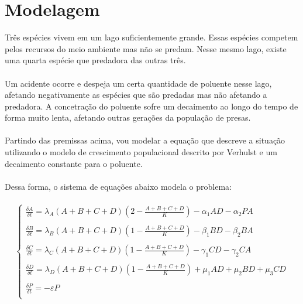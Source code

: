 \documentclass[a4paper]{article}
\begin{document}
\section{Modelagem}
Tr\^es esp\'ecies vivem em um lago suficientemente grande. Essas esp\'ecies competem pelos recursos do meio ambiente mas n\~ao se predam. Nesse mesmo lago, existe uma quarta esp\'ecie que predadora das outras tr\^es.
\\
\\
Um acidente ocorre e despeja um certa quantidade de poluente nesse lago, afetando negativamente as esp\'ecies que s\~ao predadas mas n\~ao afetando a predadora. A concetra\c{c}\~ao do poluente sofre um decaimento ao longo do tempo de forma muito lenta, afetando outras gera\c{c}\~oes da popula\c{c}\~ao de presas.
\\
\\
Partindo das premissas acima, vou modelar a equa\c{c}\~ao que descreve a situa\c{c}\~ao utilizando o modelo de crescimento populacional descrito por Verhulst e um decaimento constante para o poluente.
\\\
\\
Dessa forma, o sistema de equa\c{c}\~oes abaixo modela o problema:
\\
\\
\begin{equation}
\left\{\begin{array}{l}
\frac{\delta A}{\delta t} =  \lambda_A (A + B + C + D)(2 - \frac{A + B + C +D}{K}) -\alpha_1AD - \alpha_2PA  \\
\\
\frac{\delta B}{\delta t} =  \lambda_B (A + B + C + D)(1 - \frac{A + B + C +D}{K}) -\beta_1BD - \beta_2BA  \\
\\
\frac{\delta C}{\delta t} =  \lambda_C (A + B + C + D)(1 - \frac{A + B + C +D}{K}) -\gamma_1CD - \gamma_2CA  \\
\\
\frac{\delta D}{\delta t} =  \lambda_D (A + B + C + D)(1 - \frac{A + B + C +D}{K}) + \mu_1AD + \mu_2 BD + \mu_3CD  \\
\\
\frac{\delta P}{\delta t} = - \varepsilon P \\
\end{array}
\end{equation}
\\
\end{document}

